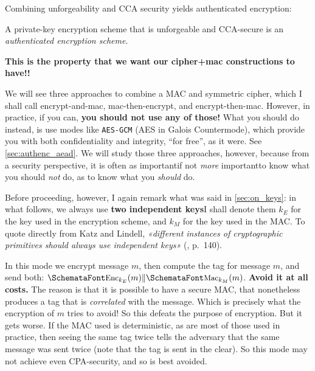   Combining unforgeability and CCA security yields authenticated encryption:
  \begin{definition}
    \label{def:authenc_scheme}
    A private-key encryption scheme that is unforgeable and CCA-secure is an \emph{authenticated encryption scheme}.
  \end{definition}
  \textbf{This is the property that we want our cipher+mac constructions to have!!}

  \bigskip

  \noindent We will see three approaches to combine a MAC and symmetric cipher, which I shall call encrypt-and-mac, mac-then-encrypt, and encrypt-then-mac. However, in practice, if you can, \textbf{you should not use any of those!} What you should do instead, is use modes like \texttt{AES-GCM} (AES in Galois Countermode), which provide you with both confidentiality and integrity, ``for free'', as it were. See \ts\ref{sec:authenc_aead}. We will study those three approaches, however, because from a security perspective, it is often as important\emd if not \emph{more} important\emd to know what you should \textit{not} do, as to know what you \textit{should} do.


  Before proceeding, however, I again remark what was said in \ts\ref{sec:on_keys}: in what follows, we always use \textbf{two independent keys}\emd I shall denote them $k_E$ for the key used in the encryption scheme, and $k_M$ for the key used in the MAC. To quote directly from Katz and Lindell, \emph{«different instances of cryptographic primitives should always use independent keys»} (\cite{KatzLindell:IMC}, p.\ 140).

  \bigskip

   In this mode we encrypt message $m$, then compute the tag for message $m$, and send both: $\myemph{Enc}_{k_E}(m)\|\myemph{Mac}_{k_M}(m)$. \textbf{Avoid it at all costs.} The reason is that it is possible to have a secure MAC, that nonetheless produces a tag that is \emph{correlated} with the message. Which is precisely what the encryption of $m$ tries to avoid! So this defeats the purpose of encryption. But it gets worse. If the MAC used is deterministic, as are most of those used in practice, then seeing the same tag twice tells the adversary that the same message was sent twice (note that the tag is sent in the clear). So this mode may not achieve even CPA-security, and so is best avoided.

